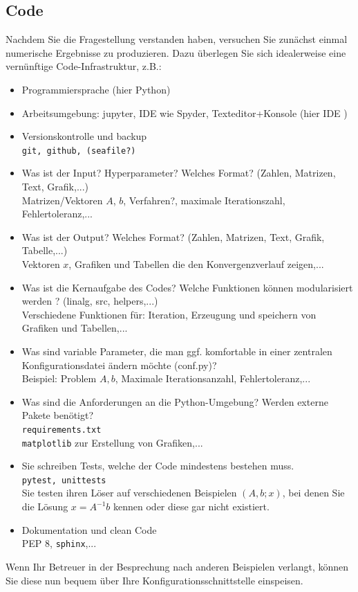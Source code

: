 \subsection{Code}
Nachdem Sie die Fragestellung verstanden haben, versuchen Sie zunächst einmal numerische Ergebnisse zu produzieren. Dazu überlegen Sie sich idealerweise eine vernünftige Code-Infrastruktur, z.B.:

\begin{itemize}
	\item Programmiersprache (hier Python)
	\item Arbeitsumgebung: jupyter, IDE wie Spyder, Texteditor+Konsole (hier IDE \pycharm)
	\item Versionskontrolle und backup\\
	{\beispiel \texttt{git, github, (seafile?)}}
	\item Was ist der Input? Hyperparameter? Welches Format? (Zahlen, Matrizen, Text, Grafik,...)\\
	{\beispiel Matrizen/Vektoren $A$, $b$, Verfahren?, maximale Iterationszahl, Fehlertoleranz,...}
	\item Was ist der Output? Welches Format? (Zahlen, Matrizen, Text, Grafik, Tabelle,...)
	\\
	{\beispiel Vektoren $x$, Grafiken und Tabellen die den Konvergenzverlauf zeigen,...}
	\item Was ist die Kernaufgabe des Codes? Welche Funktionen können modularisiert werden ? (linalg, src, helpers,...)\\
	{\beispiel Verschiedene Funktionen für: Iteration, Erzeugung und speichern von Grafiken und Tabellen,... }
	\item Was sind variable Parameter, die man ggf. komfortable in einer zentralen Konfigurationsdatei ändern möchte (conf.py)? \\
	{\beispiel Beispiel: Problem $A, b$, Maximale Iterationsanzahl, Fehlertoleranz,...}
	\item Was sind die Anforderungen an die Python-Umgebung? Werden externe Pakete benötigt?\\ \texttt{requirements.txt}\\
	{\beispiel \texttt{matplotlib} zur Erstellung von Grafiken,...}
	\item Sie schreiben Tests, welche der Code mindestens bestehen muss.\\ \texttt{pytest, unittests}\\
	{\beispiel Sie testen ihren Löser auf verschiedenen Beispielen $(A,b;x)$, bei denen Sie die Lösung $x =A^{-1}b$ kennen oder diese gar nicht existiert.}
	\item Dokumentation und clean Code\\
	{\beispiel PEP 8, \texttt{sphinx},...}
\end{itemize}
Wenn Ihr Betreuer in der Besprechung nach anderen Beispielen verlangt, können Sie diese nun bequem über Ihre Konfigurationsschnittstelle einspeisen.


